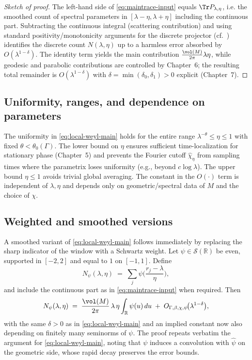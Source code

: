 \begin{proof}[Sketch of proof]
The left-hand side of \eqref{eq:maintrace-input} equals $\Tr P_{\lambda,\eta}$, i.e. the smoothed count of spectral parameters in $[\lambda-\eta,\lambda+\eta]$ including the continuous part. Subtracting the continuous integral (scattering contribution) and using standard positivity/monotonicity arguments for the discrete projector (cf.~\cite{Hejhal1983, Iwaniec2002}) identifies the discrete count $N(\lambda,\eta)$ up to a harmless error absorbed by $O(\lambda^{1-\delta})$. The identity term yields the main contribution $\frac{\vol(M)}{2\pi}\lambda\eta$, while geodesic and parabolic contributions are controlled by Chapter~6; the resulting total remainder is $O(\lambda^{1-\delta})$ with $\delta=\min(\delta_0,\delta_1)>0$ explicit (Chapter~7).
\end{proof}

\subsection{Uniformity, ranges, and dependence on parameters}
The uniformity in \eqref{eq:local-weyl-main} holds for the entire range $\lambda^{-\theta}\le \eta\le 1$ with fixed $\theta<\theta_0(\Gamma)$. The lower bound on $\eta$ ensures sufficient time-localization for stationary phase (Chapter~5) and prevents the Fourier cutoff $\widehat{\chi}_\eta$ from sampling times where the parametrix loses uniformity (e.g., beyond $c\log\lambda$). The upper bound $\eta\le 1$ avoids trivial global averaging. The constant in the $O(\cdot)$ term is independent of $\lambda,\eta$ and depends only on geometric/spectral data of $M$ and the choice of $\chi$.

\subsection{Weighted and smoothed versions}
A smoothed variant of \eqref{eq:local-weyl-main} follows immediately by replacing the sharp indicator of the window with a Schwartz weight. Let $\psi\in\mathcal{S}(\mathbb{R})$ be even, supported in $[-2,2]$ and equal to $1$ on $[-1,1]$. Define
\[
N_\psi(\lambda,\eta)\;=\;\sum_j \psi\!\Big(\frac{r_j-\lambda}{\eta}\Big),
\]
and include the continuous part as in \eqref{eq:maintrace-input} when required. Then
\begin{equation}\label{eq:local-weyl-weighted}
N_\psi(\lambda,\eta) \;=\; \frac{\vol(M)}{2\pi}\,\lambda\,\eta \int_{\mathbb{R}}\psi(u)\,du
\;+\; O_{\Gamma,\beta,\chi,\psi}\!\big(\lambda^{1-\delta}\big),
\end{equation}
with the same $\delta>0$ as in \eqref{eq:local-weyl-main} and an implied constant now also depending on finitely many seminorms of $\psi$. The proof repeats verbatim the argument for \eqref{eq:local-weyl-main}, noting that $\psi$ induces a convolution with $\widehat{\psi}$ on the geometric side, whose rapid decay preserves the error bounds.

